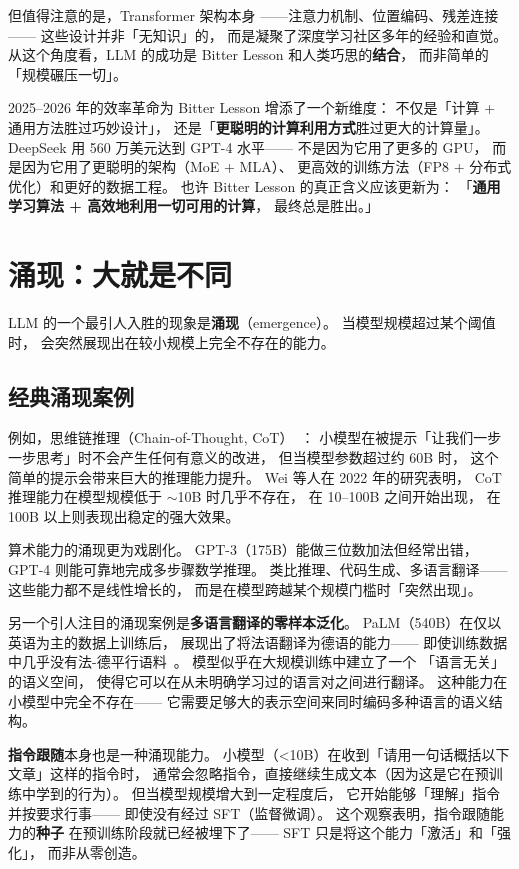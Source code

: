 但值得注意的是，Transformer 架构本身
——注意力机制、位置编码、残差连接——
这些设计并非「无知识」的，
而是凝聚了深度学习社区多年的经验和直觉。
从这个角度看，LLM 的成功是
Bitter Lesson 和人类巧思的\textbf{结合}，
而非简单的「规模碾压一切」。

2025--2026 年的效率革命为 Bitter Lesson 增添了一个新维度：
不仅是「计算 + 通用方法胜过巧妙设计」，
还是「\textbf{更聪明的计算利用方式}胜过更大的计算量」。
DeepSeek 用 560 万美元达到 GPT-4 水平——
不是因为它用了更多的 GPU，
而是因为它用了更聪明的架构（MoE + MLA）、
更高效的训练方法（FP8 + 分布式优化）和更好的数据工程。
也许 Bitter Lesson 的真正含义应该更新为：
「\textbf{通用学习算法 + 高效地利用一切可用的计算}，
最终总是胜出。」

\section{涌现：大就是不同}

LLM 的一个最引人入胜的现象是\textbf{涌现}（emergence）。
当模型规模超过某个阈值时，
会突然展现出在较小规模上完全不存在的能力。

\subsection{经典涌现案例}

例如，思维链推理（Chain-of-Thought, CoT）~\cite{wei2022cot}：
小模型在被提示「让我们一步一步思考」时不会产生任何有意义的改进，
但当模型参数超过约 60B 时，
这个简单的提示会带来巨大的推理能力提升。
Wei 等人在 2022 年的研究表明，
CoT 推理能力在模型规模低于 $\sim$10B 时几乎不存在，
在 10--100B 之间开始出现，
在 100B 以上则表现出稳定的强大效果。

算术能力的涌现更为戏剧化。
GPT-3（175B）能做三位数加法但经常出错，
GPT-4 则能可靠地完成多步骤数学推理。
类比推理、代码生成、多语言翻译——
这些能力都不是线性增长的，
而是在模型跨越某个规模门槛时「突然出现」。

另一个引人注目的涌现案例是\textbf{多语言翻译的零样本泛化}。
PaLM（540B）在仅以英语为主的数据上训练后，
展现出了将法语翻译为德语的能力——
即使训练数据中几乎没有法-德平行语料~\cite{chowdhery2022palm}。
模型似乎在大规模训练中建立了一个
「语言无关」的语义空间，
使得它可以在从未明确学习过的语言对之间进行翻译。
这种能力在小模型中完全不存在——
它需要足够大的表示空间来同时编码多种语言的语义结构。

\textbf{指令跟随}本身也是一种涌现能力。
小模型（<10B）在收到「请用一句话概括以下文章」这样的指令时，
通常会忽略指令，直接继续生成文本（因为这是它在预训练中学到的行为）。
但当模型规模增大到一定程度后，
它开始能够「理解」指令并按要求行事——
即使没有经过 SFT（监督微调）。
这个观察表明，指令跟随能力的\textbf{种子}
在预训练阶段就已经被埋下了——
SFT 只是将这个能力「激活」和「强化」，
而非从零创造。

